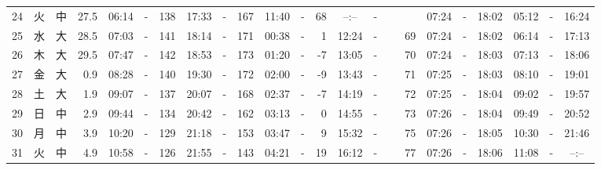\documentclass[12pt,a4j]{jsarticle}
\begin{document}
\begin{table}[htbp]
\begin{center}
{\begin{tabular}{|rc|cr|ccrccr|ccrccr|ccc|ccc|}
24 & 火 & 中 & 27.5 &  06:14 &-& 138 &  17:33 &-& 167 &  11:40 &-&  68 &  --:-- &-&~~~~~ & 07:24 & -& 18:02 & 05:12 & -& 16:24 \\
25 & 水 & 大 & 28.5 &  07:03 &-& 141 &  18:14 &-& 171 &  00:38 &-&   1 &  12:24 &-&  69 & 07:24 & -& 18:02 & 06:14 & -& 17:13 \\
26 & 木 & 大 & 29.5 &  07:47 &-& 142 &  18:53 &-& 173 &  01:20 &-&  -7 &  13:05 &-&  70 & 07:24 & -& 18:03 & 07:13 & -& 18:06 \\
27 & 金 & 大 &  0.9 &  08:28 &-& 140 &  19:30 &-& 172 &  02:00 &-&  -9 &  13:43 &-&  71 & 07:25 & -& 18:03 & 08:10 & -& 19:01 \\
28 & 土 & 大 &  1.9 &  09:07 &-& 137 &  20:07 &-& 168 &  02:37 &-&  -7 &  14:19 &-&  72 & 07:25 & -& 18:04 & 09:02 & -& 19:57 \\
29 & 日 & 中 &  2.9 &  09:44 &-& 134 &  20:42 &-& 162 &  03:13 &-&   0 &  14:55 &-&  73 & 07:26 & -& 18:04 & 09:49 & -& 20:52 \\
30 & 月 & 中 &  3.9 &  10:20 &-& 129 &  21:18 &-& 153 &  03:47 &-&   9 &  15:32 &-&  75 & 07:26 & -& 18:05 & 10:30 & -& 21:46 \\
31 & 火 & 中 &  4.9 &  10:58 &-& 126 &  21:55 &-& 143 &  04:21 &-&  19 &  16:12 &-&  77 & 07:26 & -& 18:06 & 11:08 & -& --:-- \\
   \hline
   \end{tabular}}
   \end{center}
\end{table}
\newpage
\end{document}
